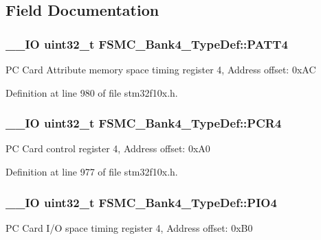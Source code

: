 \subsection{Field Documentation}
\hypertarget{struct_f_s_m_c___bank4___type_def_a4cccc7802b573135311cc38e7f247ff5}{
\subsubsection[{P\-A\-T\-T4}]{\setlength{\rightskip}{0pt plus 5cm}\-\_\-\-\_\-\-I\-O {\bf uint32\-\_\-t} F\-S\-M\-C\-\_\-\-Bank4\-\_\-\-Type\-Def\-::\-P\-A\-T\-T4}}\label{struct_f_s_m_c___bank4___type_def_a4cccc7802b573135311cc38e7f247ff5}
P\-C Card Attribute memory space timing register 4, Address offset\-: 0x\-A\-C 

Definition at line 980 of file stm32f10x.\-h.

\hypertarget{struct_f_s_m_c___bank4___type_def_a0470b5bbb53e9f1bbde09829371eb72f}{
\subsubsection[{P\-C\-R4}]{\setlength{\rightskip}{0pt plus 5cm}\-\_\-\-\_\-\-I\-O {\bf uint32\-\_\-t} F\-S\-M\-C\-\_\-\-Bank4\-\_\-\-Type\-Def\-::\-P\-C\-R4}}\label{struct_f_s_m_c___bank4___type_def_a0470b5bbb53e9f1bbde09829371eb72f}
P\-C Card control register 4, Address offset\-: 0x\-A0 

Definition at line 977 of file stm32f10x.\-h.

\hypertarget{struct_f_s_m_c___bank4___type_def_a531ebc38c47bebfb198eafb4de24cb2a}{
\subsubsection[{P\-I\-O4}]{\setlength{\rightskip}{0pt plus 5cm}\-\_\-\-\_\-\-I\-O {\bf uint32\-\_\-t} F\-S\-M\-C\-\_\-\-Bank4\-\_\-\-Type\-Def\-::\-P\-I\-O4}}\label{struct_f_s_m_c___bank4___type_def_a531ebc38c47bebfb198eafb4de24cb2a}
P\-C Card I/\-O space timing register 4, Address offset\-: 0x\-B0 


